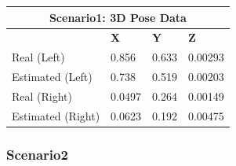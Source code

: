 \begin{table}[H]
  \centering
  \begin{tabular}{ |p{4cm}|p{2cm}|p{2cm}|p{2cm}|  }
    \hline
    \multicolumn{4}{|c|}{Scenario1: 3D Pose Data} \\
    \hline
    & \textbf{X} & \textbf{Y} & \textbf{Z} \\
    \hline
    Real (Left) & 0.856 & 0.633 & 0.00293 \\
    Estimated (Left) & 0.738 & 0.519 & 0.00203 \\
    \hline
    Real (Right) & 0.0497 & 0.264 & 0.00149 \\
    Estimated (Right) & 0.0623 & 0.192 & 0.00475 \\
    \hline
  \end{tabular}
\end{table}



\subsubsection{Scenario2}

